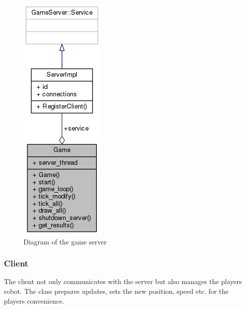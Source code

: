 \documentclass[12pt]{report}
\begin{document}
\begin{figure}[h]
\centering
\includegraphics[scale = 0.7]{Game_graph.png}
\caption{Diagram of the game server}
\medskip
\end{figure}

\clearpage

\subsubsection{Client}
The client not only communicates with the server but also manages the players robot. The class prepares updates, sets the new position, speed etc. for the players convenience.
\end{document}
